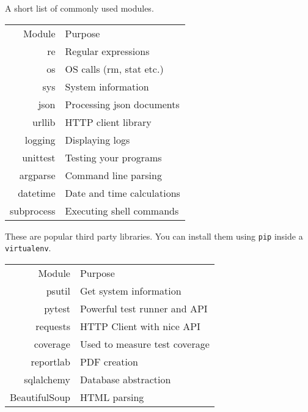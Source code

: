 A short list of commonly used modules. \\
\begin{tabular}[t]{| r | l |}
\hline
\cellcolor[gray]{0.9} Module & \cellcolor[gray]{0.9} Purpose \\
  re & Regular expressions \\
  os & OS calls (rm, stat etc.)\\
  sys & System information  \\
  json & Processing json documents \\
  urllib & HTTP client library \\
  logging & Displaying logs \\
  unittest & Testing your programs \\
  argparse & Command line parsing \\
  datetime & Date and time calculations \\
  subprocess & Executing shell commands \\
\hline
\end{tabular}


These are popular third party libraries. You can install them using \texttt{pip} inside a \texttt{virtualenv}.\\
\begin{tabular}[t]{| r | l |}
\hline
\cellcolor[gray]{0.9} Module & \cellcolor[gray]{0.9} Purpose \\
  psutil & Get system information \\
  pytest & Powerful test runner and API \\
  requests & HTTP Client with nice API \\
  coverage & Used to measure test coverage \\
  reportlab & PDF creation \\
  sqlalchemy & Database abstraction \\
  BeautifulSoup & HTML parsing \\
\hline
\end{tabular}




